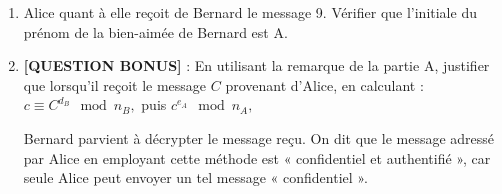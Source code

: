 {{\begin{enumerate}
    \item Alice quant à elle reçoit de Bernard le message 9. Vérifier que l'initiale du prénom de la bien-aimée de Bernard est A.
    
    \item \textbf{[QUESTION BONUS]} : En utilisant la remarque de la partie A, justifier que lorsqu'il reçoit le message \(C\) provenant d'Alice, en calculant :
    $  c \equiv C^{d_B} \mod n_B,$ puis $ c^{e_A} \mod n_A,$

Bernard parvient à décrypter le message reçu. On dit que le message adressé par Alice en employant cette méthode est « confidentiel et authentifié », car seule Alice peut envoyer un tel message « confidentiel ».
\end{enumerate}








}
}